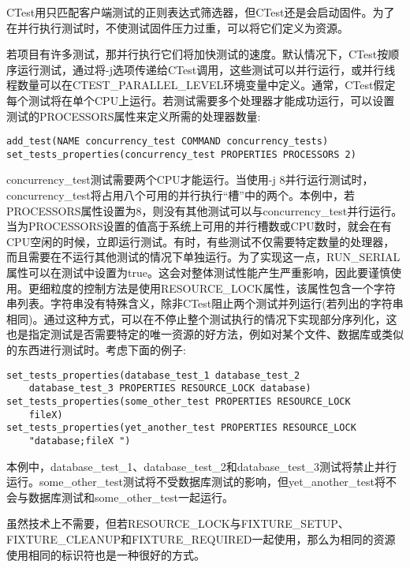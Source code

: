 CTest用只匹配客户端测试的正则表达式筛选器，但CTest还是会启动固件。为了在并行执行测试时，不使测试固件压力过重，可以将它们定义为资源。


若项目有许多测试，那并行执行它们将加快测试的速度。默认情况下，CTest按顺序运行测试，通过将-j选项传递给CTest调用，这些测试可以并行运行，或并行线程数量可以在CTEST\_PARALLEL\_LEVEL环境变量中定义。通常，CTest假定每个测试将在单个CPU上运行。若测试需要多个处理器才能成功运行，可以设置测试的PROCESSORS属性来定义所需的处理器数量:

\begin{lstlisting}[style=styleCMake]
add_test(NAME concurrency_test COMMAND concurrency_tests)
set_tests_properties(concurrency_test PROPERTIES PROCESSORS 2)
\end{lstlisting}

concurrency\_test测试需要两个CPU才能运行。当使用-j 8并行运行测试时，concurrency\_test将占用八个可用的并行执行“槽”中的两个。本例中，若PROCESSORS属性设置为8，则没有其他测试可以与concurrency\_test并行运行。当为PROCESSORS设置的值高于系统上可用的并行槽数或CPU数时，就会在有CPU空闲的时候，立即运行测试。有时，有些测试不仅需要特定数量的处理器，而且需要在不运行其他测试的情况下单独运行。为了实现这一点，RUN\_SERIAL属性可以在测试中设置为true。这会对整体测试性能产生严重影响，因此要谨慎使用。更细粒度的控制方法是使用RESOURCE\_LOCK属性，该属性包含一个字符串列表。字符串没有特殊含义，除非CTest阻止两个测试并列运行(若列出的字符串相同)。通过这种方式，可以在不停止整个测试执行的情况下实现部分序列化，这也是指定测试是否需要特定的唯一资源的好方法，例如对某个文件、数据库或类似的东西进行测试时。考虑下面的例子:

\begin{lstlisting}[style=styleCMake]
set_tests_properties(database_test_1 database_test_2
	database_test_3 PROPERTIES RESOURCE_LOCK database)
set_tests_properties(some_other_test PROPERTIES RESOURCE_LOCK
	fileX)
set_tests_properties(yet_another_test PROPERTIES RESOURCE_LOCK
	"database;fileX ")
\end{lstlisting}

本例中，database\_test\_1、database\_test\_2和database\_test\_3测试将禁止并行运行。some\_other\_test测试将不受数据库测试的影响，但yet\_another\_test将不会与数据库测试和some\_other\_test一起运行。

\begin{tcolorbox}[colback=blue!5!white,colframe=blue!75!black,title=固件为源]
虽然技术上不需要，但若RESOURCE\_LOCK与FIXTURE\_SETUP、FIXTURE\_CLEANUP和FIXTURE\_REQUIRED一起使用，那么为相同的资源使用相同的标识符也是一种很好的方式。
\end{tcolorbox}

